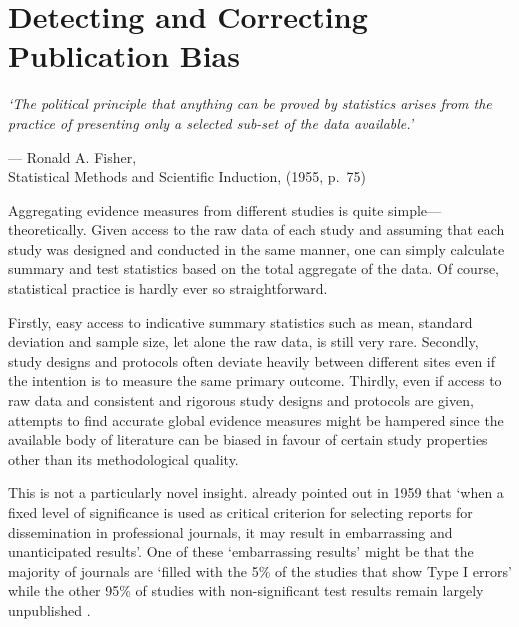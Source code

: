 \chapter{Detecting and Correcting Publication Bias}
\label{cha:publication bias}
\epigraph{\centering \textit{`The political principle that anything can be proved by statistics arises from the practice of presenting only a selected sub-set of the data available.'}}{--- Ronald A. Fisher,\\Statistical Methods and Scientific Induction, (1955, p.~75)}

Aggregating evidence measures from different studies is quite simple---theoretically. Given access to the raw data of each study and assuming that each study was designed and conducted in the same manner, one can simply calculate summary and test statistics based on the total aggregate of the data. Of course, statistical practice is hardly ever so straightforward.\par

Firstly, easy access to indicative summary statistics such as mean, standard deviation and sample size, let alone the raw data, is still very rare. Secondly, study designs and protocols often deviate heavily between different sites even if the intention is to measure the same primary outcome. Thirdly, even if access to raw data and consistent and rigorous study designs and protocols are given, attempts to find accurate global evidence measures might be hampered since the available body of literature can be biased in favour of certain study properties other than its methodological quality. \par

This is not a particularly novel insight. \citet{sterling_publication_1959} already pointed out in 1959 that `when a fixed level of significance is used as critical criterion for selecting reports for dissemination in professional journals, it may result in embarrassing and unanticipated results'. One of these `embarrassing results' might be that the majority of journals are `filled with the 5\% of the studies that show Type I errors' while the other 95\% of studies with non-significant test results remain largely unpublished \citep{rosenthal_file_1979}.\par 

